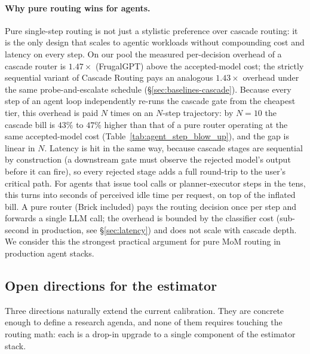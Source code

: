 \documentclass[twocolumn,10pt,a4paper]{article}
\begin{document}
\paragraph{Why pure routing wins for agents.}\label{sec:agentic-discussion} Pure single-step routing is not just a stylistic preference over cascade routing: it is the only design that scales to agentic workloads without compounding cost and latency on every step. On our pool the measured per-decision overhead of a cascade router is $1.47\times$ (FrugalGPT) above the accepted-model cost; the strictly sequential variant of Cascade Routing pays an analogous $1.43\times$ overhead under the same probe-and-escalate schedule (§\ref{sec:baselines-cascade}). Because every step of an agent loop independently re-runs the cascade gate from the cheapest tier, this overhead is paid $N$ times on an $N$-step trajectory: by $N{=}10$ the cascade bill is $43\%$ to $47\%$ higher than that of a pure router operating at the same accepted-model cost (Table~\ref{tab:agent_step_blow_up}), and the gap is linear in $N$. Latency is hit in the same way, because cascade stages are sequential by construction (a downstream gate must observe the rejected model's output before it can fire), so every rejected stage adds a full round-trip to the user's critical path. For agents that issue tool calls or planner-executor steps in the tens, this turns into seconds of perceived idle time per request, on top of the inflated bill. A pure router (Brick included) pays the routing decision once per step and forwards a single LLM call; the overhead is bounded by the classifier cost (sub-second in production, see §\ref{sec:latency}) and does not scale with cascade depth. We consider this the strongest practical argument for pure MoM routing in production agent stacks.

\subsection{Open directions for the estimator}\label{sec:future-estimator}
Three directions naturally extend the current calibration. They are concrete enough to define a research agenda, and none of them requires touching the routing math: each is a drop-in upgrade to a single component of the estimator stack.
\end{document}
